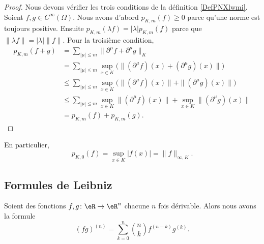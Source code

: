 \begin{proof}
	Nous devons vérifier les trois conditions de la définition \ref{DefPNXlwmi}. Soient \( f,g\in C^{\infty}(\Omega)\). Nous avons d'abord \( p_{K,m}(f)\geq 0\) parce qu'une norme est toujours positive. Ensuite \( p_{K,m}(\lambda f)=| \lambda |p_{K,m}(f)\) parce que \( \| \lambda f \|=| \lambda |\| f \|\). Pour la troisième condition,
	\begin{subequations}
		\begin{align}
			p_{K,m}(f+g) & = \sum_{| \mu |\leq m}\| \partial^{\mu}f+\partial^{\mu}g \|_{K}                                             \\
			             & =\sum_{| \mu |\leq m}\sup_{x\in K} \Big(   \| (\partial^{\mu}f)(x)+(\partial^{\mu}g)(x) \|          \Big)   \\
			             & \leq\sum_{| \mu |\leq m}\sup_{x\in K} \Big(\| (\partial^{\mu}f)(x)\|  + \|  (\partial^{\mu}g)(x) \|   \Big) \\
			             & \leq\sum_{| \mu |\leq m}\sup_{x\in K}\| (\partial^{\mu}f)(x)\|  + \sup_{x\in K} \|  (\partial^{\mu}g)(x) \| \\
			             & =p_{K,m}(f)+p_{K,m}(g).
		\end{align}
	\end{subequations}
\end{proof}

En particulier,
\begin{equation}
	p_{K,0}(f)=\sup_{x\in K}| f(x) |=\| f \|_{\infty,K}.
\end{equation}

\subsection{Formules de Leibniz}

\begin{proposition}		\label{PROPooTEACooKXUXKl}
	Soient des fonctions \(f,g \colon \eR\to \eR^n  \) chacune \( n\) fois dérivable. Alors nous avons la formule
	\begin{equation}
		(fg)^{(n)}=\sum_{k=0}^n\binom{ n }{ k }f^{(n-k)}g^{(k)}.
	\end{equation}
\end{proposition}

